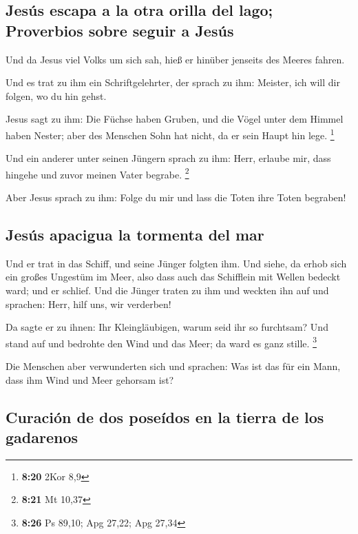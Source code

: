 \hypertarget{jesuxfas-escapa-a-la-otra-orilla-del-lago-proverbios-sobre-seguir-a-jesuxfas}{%
\subsection{Jesús escapa a la otra orilla del lago; Proverbios sobre
seguir a
Jesús}\label{jesuxfas-escapa-a-la-otra-orilla-del-lago-proverbios-sobre-seguir-a-jesuxfas}}

 Und da Jesus viel Volks um sich sah, hieß er hinüber
jenseits des Meeres fahren.

 Und es trat zu ihm ein Schriftgelehrter, der sprach zu
ihm: Meister, ich will dir folgen, wo du hin gehst.

 Jesus sagt zu ihm: Die Füchse haben Gruben, und die
Vögel unter dem Himmel haben Nester; aber des Menschen Sohn hat nicht,
da er sein Haupt hin lege. \footnote{\textbf{8:20} 2Kor 8,9}

 Und ein anderer unter seinen Jüngern sprach zu ihm:
Herr, erlaube mir, dass hingehe und zuvor meinen Vater begrabe.
\footnote{\textbf{8:21} Mt 10,37}

 Aber Jesus sprach zu ihm: Folge du mir und lass die
Toten ihre Toten begraben!

\hypertarget{jesuxfas-apacigua-la-tormenta-del-mar}{%
\subsection{Jesús apacigua la tormenta del
mar}\label{jesuxfas-apacigua-la-tormenta-del-mar}}

 Und er trat in das Schiff, und seine Jünger folgten ihm.
 Und siehe, da erhob sich ein großes Ungestüm im Meer,
also dass auch das Schifflein mit Wellen bedeckt ward; und er schlief.
 Und die Jünger traten zu ihm und weckten ihn auf und
sprachen: Herr, hilf uns, wir verderben!

 Da sagte er zu ihnen: Ihr Kleingläubigen, warum seid ihr
so furchtsam? Und stand auf und bedrohte den Wind und das Meer; da ward
es ganz stille. \footnote{\textbf{8:26} Ps 89,10; Apg 27,22; Apg 27,34}

 Die Menschen aber verwunderten sich und sprachen: Was
ist das für ein Mann, dass ihm Wind und Meer gehorsam ist?

\hypertarget{curaciuxf3n-de-dos-poseuxeddos-en-la-tierra-de-los-gadarenos}{%
\subsection{Curación de dos poseídos en la tierra de los
gadarenos}\label{curaciuxf3n-de-dos-poseuxeddos-en-la-tierra-de-los-gadarenos}}


